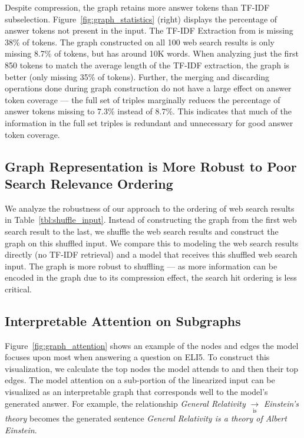 \documentclass[11pt,a4paper]{article}
\begin{document}
Despite compression, the graph retains more answer tokens than TF-IDF subselection. Figure~\ref{fig:graph_statistics} (right) displays the percentage of answer tokens not present in the input. The TF-IDF Extraction from \cite{fan2019explain} is missing 38\% of tokens. The graph constructed on all 100 web search results is only missing 8.7\% of tokens, but has around 10K words. When analyzing just the first 850 tokens to match the average length of the TF-IDF extraction, the graph is better (only missing 35\% of  tokens). Further, the merging and discarding operations done during graph construction do not have a large effect on answer token coverage --- the full set of triples marginally reduces the percentage of answer tokens missing to 7.3\%  instead of 8.7\%. This indicates that much of the information in the full set triples is redundant and unnecessary for good answer token coverage.

\subsection{Graph Representation is More Robust to Poor Search Relevance Ordering}
We analyze the robustness of our approach to the ordering of web search results in Table~\ref{tbl:shuffle_input}. Instead of constructing the graph from the first web search result to the last, we shuffle the web search results and construct the graph on this shuffled input. We compare this to  modeling the web search results directly (no TF-IDF retrieval) and a model that receives this shuffled web search input. The graph is more robust to shuffling --- as more information can be encoded in the graph due to its compression effect, the search hit ordering is less critical. 

\subsection{Interpretable Attention on Subgraphs}

Figure~\ref{fig:graph_attention} shows an example of the nodes and edges the model focuses upon most when answering a question on ELI5. To construct this visualization, we calculate the top nodes the model attends to and then their top edges. The model attention on a sub-portion of the linearized input can be visualized as an interpretable graph that corresponds well to the model's generated answer. For example, the relationship \textit{General Relativity} $\xrightarrow[\text{is}]{}$ \textit{Einstein's theory} becomes the generated sentence \textit{General Relativity is a theory of Albert Einstein}. 
\end{document}
